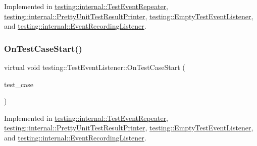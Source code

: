 Implemented in \hyperlink{classtesting_1_1internal_1_1_test_event_repeater_a0a335e1c3957a8c699ed56e37ea7b978}{testing\+::internal\+::\+Test\+Event\+Repeater}, \hyperlink{classtesting_1_1internal_1_1_pretty_unit_test_result_printer_a7a62fe58fa6f6aace813eb62b31e5a51}{testing\+::internal\+::\+Pretty\+Unit\+Test\+Result\+Printer}, \hyperlink{classtesting_1_1_empty_test_event_listener_a6bec703158283104c4298f7d8a528515}{testing\+::\+Empty\+Test\+Event\+Listener}, and \hyperlink{classtesting_1_1internal_1_1_event_recording_listener_a4d0cb8a389c7339bce0aa6128291529f}{testing\+::internal\+::\+Event\+Recording\+Listener}.

\mbox{\label{classtesting_1_1_test_event_listener_ab4ed885d63f5bbff8076c1329b3dfe36}} 
\subsubsection{\texorpdfstring{On\+Test\+Case\+Start()}{OnTestCaseStart()}}
{\footnotesize\ttfamily virtual void testing\+::\+Test\+Event\+Listener\+::\+On\+Test\+Case\+Start (\begin{DoxyParamCaption}\item[{const \hyperlink{classtesting_1_1_test_case}{Test\+Case} \&}]{test\+\_\+case }\end{DoxyParamCaption})\hspace{0.3cm}{\ttfamily [pure virtual]}}



Implemented in \hyperlink{classtesting_1_1internal_1_1_test_event_repeater_a70124c738caa338bcd723eb2a51c8b3e}{testing\+::internal\+::\+Test\+Event\+Repeater}, \hyperlink{classtesting_1_1internal_1_1_pretty_unit_test_result_printer_adcb68c729565d4bcdf8418a52902c3de}{testing\+::internal\+::\+Pretty\+Unit\+Test\+Result\+Printer}, \hyperlink{classtesting_1_1_empty_test_event_listener_ae4707ed9cc7ace5241bc8ccc4051209b}{testing\+::\+Empty\+Test\+Event\+Listener}, and \hyperlink{classtesting_1_1internal_1_1_event_recording_listener_a18c28e1d1c3a1e74e225966456786f8e}{testing\+::internal\+::\+Event\+Recording\+Listener}.

\mbox{\label{classtesting_1_1_test_event_listener_abb1c44525ef038500608b5dc2f17099b}} 
